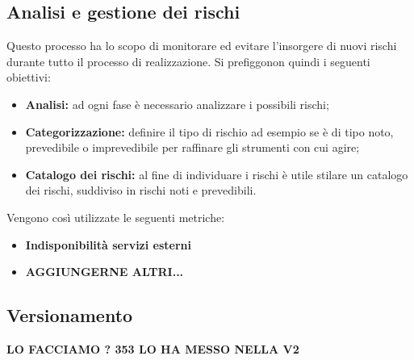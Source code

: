 \subsection{Analisi e gestione dei rischi}
Questo processo ha lo scopo di monitorare ed evitare l'insorgere di nuovi rischi durante tutto il processo di realizzazione. Si prefiggonon quindi i seguenti obiettivi:
\begin{itemize}
	\item{\textbf{Analisi:} ad ogni fase è necessario analizzare i possibili rischi;}
	\item{\textbf{Categorizzazione:}  definire il tipo di rischio ad esempio se è di tipo noto, prevedibile o imprevedibile per raffinare gli strumenti con cui agire;}
	\item{\textbf{Catalogo dei rischi:} al fine di individuare i rischi è utile stilare un catalogo dei rischi, suddiviso in rischi noti e prevedibili.}
\end{itemize}
Vengono così utilizzate le seguenti metriche: 
\begin{itemize}
	\item{\textbf{Indisponibilità servizi esterni}}
	\item{\textbf{AGGIUNGERNE ALTRI...}}
\end{itemize}
\begin{table}[!htpb]
\end{table}
\subsection{Versionamento}
\textbf{LO FACCIAMO ? 353 LO HA MESSO NELLA V2}